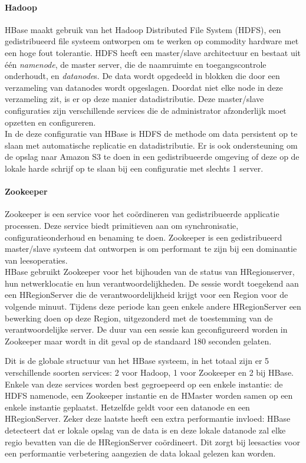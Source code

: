 \paragraph{Hadoop\cite{borthakur2007hadoop}} HBase maakt gebruik van het Hadoop Distributed File System (HDFS), een gedistribueerd file systeem ontworpen om te werken op commodity hardware met een hoge fout tolerantie. HDFS heeft een master/slave architectuur en bestaat uit één \textit{namenode}, de master server, die de naamruimte en toegangscontrole onderhoudt, en \textit{datanode}s. De data wordt opgedeeld in blokken die door een verzameling van datanodes wordt opgeslagen. Doordat niet elke node in deze verzameling zit, is er op deze manier datadistributie. Deze master/slave configuraties zijn verschillende services die de administrator afzonderlijk moet opzetten en configureren. \\
In de deze configuratie van HBase is HDFS de methode om data persistent op te slaan met automatische replicatie en datadistributie. Er is ook ondersteuning om de opslag naar Amazon S3 te doen in een gedistribueerde omgeving of deze op de lokale harde schrijf op te slaan bij een configuratie met slechts 1 server.\cite{george2011hbase}

\paragraph{Zookeeper\cite{hunt2010zookeeper}} Zookeeper is een service voor het coördineren van gedistribueerde applicatie processen. Deze service biedt primitieven aan om synchronisatie, configuratieonderhoud en benaming te doen. Zookeeper is een gedistribueerd master/slave systeem dat ontworpen is om performant te zijn bij een dominantie van leesoperaties.  \\
HBase gebruikt Zookeeper voor het bijhouden van de status van HRegionserver, hun netwerklocatie en hun verantwoordelijkheden. De sessie wordt toegekend aan een HRegionServer die de verantwoordelijkheid krijgt voor een Region voor de volgende minuut. Tijdens deze periode kan geen enkele andere HRegionServer een bewerking doen op deze Region, uitgezonderd met de toestemming van de verantwoordelijke server. \cite{george2011hbase} De duur van een sessie kan geconfigureerd worden in Zookeeper maar wordt in dit geval op de standaard 180 seconden gelaten. 

Dit is de globale structuur van het HBase systeem, in het totaal zijn er 5 verschillende soorten services: 2 voor Hadoop, 1 voor Zookeeper en 2 bij HBase. Enkele van deze services worden best gegroepeerd op een enkele instantie: de HDFS namenode, een Zookeeper instantie en de HMaster worden samen op een enkele instantie geplaatst. Hetzelfde geldt voor een datanode en een HRegionServer. Zeker deze laatste heeft een extra performantie invloed: HBase detecteert dat er lokale opslag van de data is en deze lokale datanode zal elke regio bevatten van die de HRegionServer coördineert. Dit zorgt bij leesacties voor een performantie verbetering aangezien de data lokaal gelezen kan worden.

